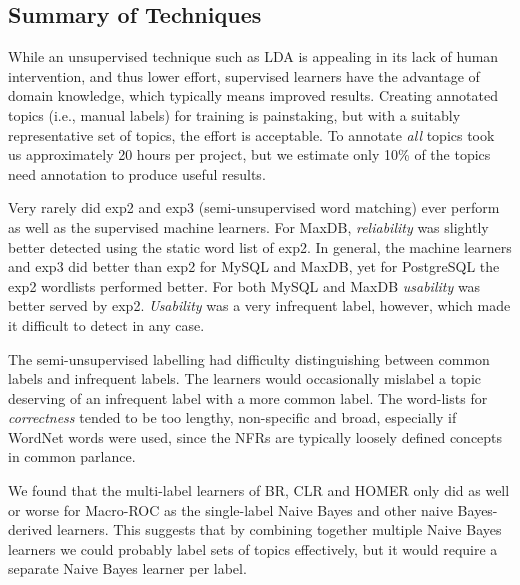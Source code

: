 \documentclass[smallextended]{svjour3}       %
\begin{document}




\subsection{Summary of Techniques}
While an unsupervised technique such as LDA is appealing in its lack of human intervention, and thus lower effort, 
supervised learners have the advantage of domain knowledge, which typically means improved results. 
Creating annotated topics (i.e., manual labels) for training is painstaking, but with a suitably representative set of topics, the effort is acceptable. To
annotate \emph{all} topics took us approximately 20 hours per project, but we estimate only 10\% of the topics need annotation to produce useful results.

Very rarely did \textsf{exp2} and \textsf{exp3} (semi-unsupervised word matching) ever perform as well as the supervised machine learners. 
For MaxDB, \textit{reliability} was slightly better detected using the static word list of \textsf{exp2}. 
In general, the machine learners and \textsf{exp3} did better than
\textsf{exp2} for MySQL and MaxDB, yet for PostgreSQL the
\textsf{exp2} wordlists performed better.
For both MySQL and MaxDB \textit{usability} was better served by \textsf{exp2}. 
\textit{Usability} was a very infrequent label, however, which made it difficult to detect in any case.

The semi-unsupervised labelling had difficulty distinguishing between common labels and infrequent labels. 
The learners would occasionally mislabel a topic deserving of an infrequent label with a more common label.
The word-lists for \emph{correctness} tended to be too lengthy, non-specific and broad, especially if WordNet words were used, since the NFRs are
typically loosely defined concepts in common parlance.

We found that the multi-label learners of BR, CLR and HOMER only did
as well or worse for Macro-ROC as the single-label Naive Bayes and other naive Bayes-derived learners. 
This suggests that by combining together multiple Naive Bayes learners
we could probably label sets of topics effectively, but it would
require a separate Naive Bayes learner per label.
\end{document}
